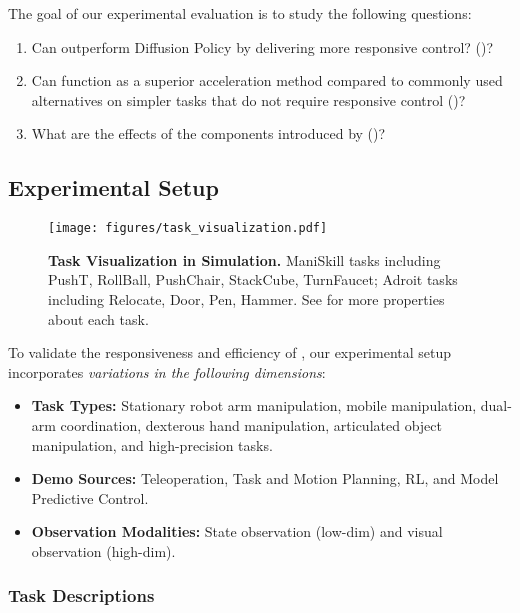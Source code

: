 The goal of our experimental evaluation is to study the following questions:

\begin{enumerate}
    \item Can \ourslong outperform Diffusion Policy by delivering more responsive control? ()?
    \item Can \ourslong function as a superior acceleration method compared to commonly used alternatives on simpler tasks that do not require responsive control ()?
    \item What are the effects of the components introduced by \ourslong ()?
\end{enumerate}

\subsection{Experimental Setup}

\begin{figure}[!ht]
    \centering
    \texttt{[image: figures/task\_visualization.pdf]}
    \caption{\textbf{Task Visualization in Simulation.} ManiSkill tasks including PushT, RollBall, PushChair, StackCube, TurnFaucet; Adroit tasks including Relocate, Door, Pen, Hammer. See  for more properties about each task.}
    \label{fig:task_vis}
\end{figure}

To validate the responsiveness and efficiency of \ourslong, our experimental setup incorporates \textit{variations in the following dimensions}:

\begin{itemize}
    \item \textbf{Task Types:} Stationary robot arm manipulation, mobile manipulation, dual-arm coordination, dexterous hand manipulation, articulated object manipulation, and high-precision tasks.
    \item \textbf{Demo Sources:} Teleoperation, Task and Motion Planning, RL, and Model Predictive Control.
    \item \textbf{Observation Modalities:} State observation (low-dim) and visual observation (high-dim).
\end{itemize} 

\subsubsection{Task Descriptions}

